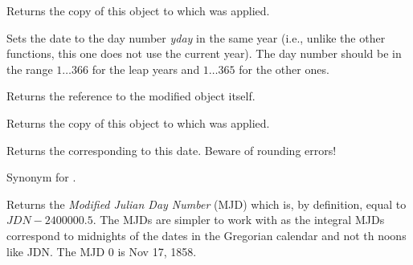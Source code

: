 
Returns the copy of this object to which
 was applied.


\label{wxdatetimesettoyearday}


Sets the date to the day number {\it yday} in the same year (i.e., unlike the
other functions, this one does not use the current year). The day number
should be in the range $1\ldots366$ for the leap years and $1\ldots365$ for
the other ones.

Returns the reference to the modified object itself.


\label{wxdatetimegetyearday}


Returns the copy of this object to which
 was applied.



\label{wxdatetimegetjuliandaynumber}


Returns the  corresponding to this date. Beware
of rounding errors!




\label{wxdatetimegetjdn}


Synonym for .


\label{wxdatetimegetmodifiedjuliandaynumber}


Returns the {\it Modified Julian Day Number} (MJD) which is, by definition,
equal to $JDN - 2400000.5$. The MJDs are simpler to work with as the integral
MJDs correspond to midnights of the dates in the Gregorian calendar and not th
noons like JDN. The MJD $0$ is Nov 17, 1858.


